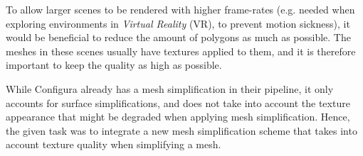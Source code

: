 To allow larger scenes to be rendered with higher frame-rates (e.g. needed when exploring environments in \emph{Virtual Reality} (VR), to prevent motion sickness), it would be beneficial to reduce the amount of polygons as much as possible. The meshes in these scenes usually have textures applied to them, and it is therefore important to keep the quality as high as possible.

While Configura already has a mesh simplification in their pipeline, it only accounts for surface simplifications, and does not take into account the texture appearance that might be degraded when applying mesh simplification. Hence, the given task was to integrate a new mesh simplification scheme that takes into account texture quality when simplifying a mesh.


